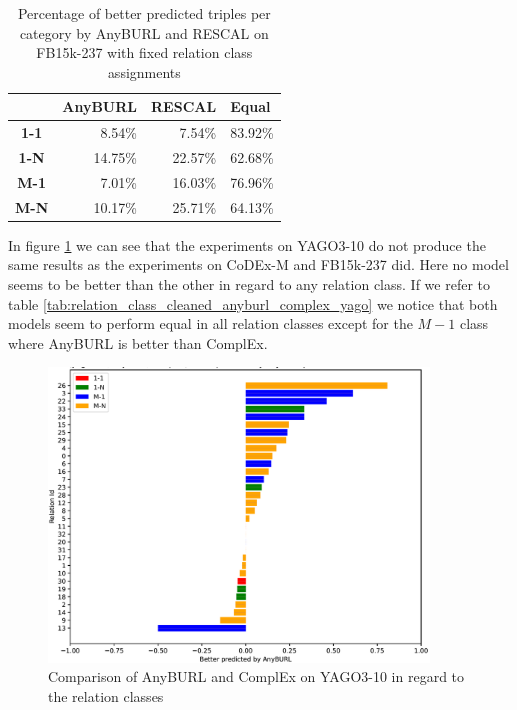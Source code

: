\begin{table}[H]
\centering
\begin{tabular}{c|rrr}
\multicolumn{1}{l|}{} & \multicolumn{1}{c}{\textbf{AnyBURL}} & \multicolumn{1}{c}{\textbf{RESCAL}} & \multicolumn{1}{l}{\textbf{Equal}} \\ \hline
\textbf{1-1} & 8.54\% & 7.54\% & 83.92\% \\
\textbf{1-N} & 14.75\% & 22.57\% & 62.68\% \\
\textbf{M-1} & 7.01\% & 16.03\% & 76.96\% \\
\textbf{M-N} & 10.17\% & 25.71\% & 64.13\%
\end{tabular}
\caption{Percentage of better predicted triples per category by AnyBURL and RESCAL on FB15k-237 with fixed relation class assignments}
\label{tab:relation_class_cleaned_anyburl_rescal_fb15k}
\end{table}

In figure \ref{fig:relation_class_anyburl_complex_yago} we can see that the experiments on YAGO3-10 do not produce the same results as the experiments on CoDEx-M and FB15k-237 did. Here no model seems to be better than the other in regard to any relation class. If we refer to table \ref{tab:relation_class_cleaned_anyburl_complex_yago} we notice that both models seem to perform equal in all relation classes except for the $M-1$ class where AnyBURL is better than ComplEx. 

\begin{figure}[H]
\centering
\includegraphics[width=0.9\textwidth]{images/relation_class_anyburl_complex_yago.PNG}
\caption{Comparison of AnyBURL and ComplEx on YAGO3-10 in regard to the relation classes}
\label{fig:relation_class_anyburl_complex_yago}
\end{figure}

